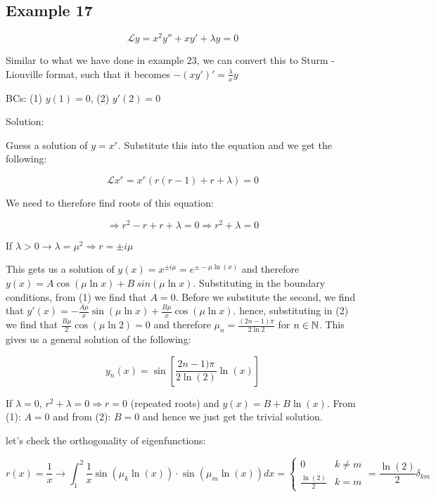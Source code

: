 \documentclass{article}
\begin{document}
\subsection{Example 17}

$$\mathcal{L} y = x^2 y'' + x y' + \lambda y = 0$$

Similar to what we have done in example 23, we can convert this to Sturm - Liouville format, such that it becomes $- (xy')' = \frac{\lambda}{x} y$

BCs: (1) $y(1) = 0$, (2) $y'(2) = 0$

Solution:

Guess a solution of $y = x^r$. Substitute this into the equation and we get the following:

$$\mathcal{L} x^r = x^r  \left(r(r-1) + r + \lambda \right) = 0$$

We need to therefore find roots of this equation:

$$\Rightarrow r^2 - r + r + \lambda = 0 \Rightarrow r^2 + \lambda = 0$$

If $\lambda > 0 \longrightarrow \lambda = \mu^2 \Rightarrow r = \pm i \mu$

This gets us a solution of $y(x) = x^{\pm i \mu} = e^{\pm - \mu \ln(x)}$ and therefore $y(x) = A \cos (\mu \ln x) + B\ sin(\mu \ln x)$. Substituting in the boundary conditions, from (1) we find that $A = 0$. Before we substitute the second, we find that $y'(x) = - \frac{A \mu}{x} \sin(\mu \ln x) + \frac{B \mu}{x} \cos(\mu \ln x)$. hence, substituting in (2) we find that $\frac{B \mu}{2} \cos(\mu \ln 2) = 0$ and therefore $\mu_n = \frac{(2n-1) \pi}{2 \ln 2}$ for $n \in \mathbb{N}$. This gives us a general solution of the following:

$$y_n(x) = \sin \left[ \frac{2n-1) \pi}{2 \ln(2)} \ln(x) \right]$$


If $\lambda = 0$, $r^2 + \lambda = 0 \Rightarrow r = 0$ (repeated roots) and $y(x) = B + B \ln (x)$. From (1): $A = 0$ and from (2): $B = 0$ and hence we just get the trivial solution. 

\hfill

let's check the orthogonality of eigenfunctions:

$$r(x) = \frac{1}{x} \to \int_1^2 \frac{1}{x} \sin(\mu_k \ln (x)) \cdot \sin (\mu_m \ln(x)) dx = \left\{ \begin{matrix} 0 & k \neq m \\ \frac{\ln(2)}{2} & k = m \end{matrix} \right. = \frac{\ln(2)}{2} \delta_{km}$$
\end{document}
